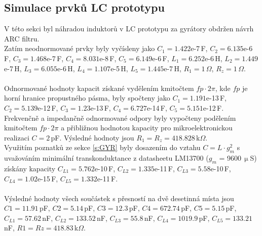 \subsection{Simulace prvků LC prototypu}\label{s:ARC}
V této sekci byl náhradou induktorů v LC prototypu za gyrátory obdržen návrh ARC filtru.\\
Zatím neodnormované prvky byly vyčísleny jako $C_1 = 1.422$e-7\,F, $C_2 = 6.135$e-6\,F, $C_3 = 1.468$e-7\,F, $C_4 = 8.031$e-8\,F, $C_5 = 6.149$e-6\,F, $L_1 = 6.252$e-6\,H, $L_2 = 1.449$e-7\,H, $L_3 = 6.055$e-6\,H, $L_4 = 1.107$e-5\,H, $L_5 = 1.445$e-7\,H, $R_1 = 1$\,$\Omega$, $R_z = 1$\,$\Omega$.\\
\\
\noindent Odnormované hodnoty kapacit získané vydělením kmitočtem $fp \cdot 2 \pi$, kde $fp$ je horní hranice propustného pásma, byly spočteny jako $C_1 = 1.191$e-13\,F, $C_2 = 5.139$e-12\,F, $C_3 = 1.23$e-13\,F, $C_4 = 6.727$e-14\,F, $C_5 = 5.151$e-12\,F.\\
\noindent Frekvenčně a impedančně odnormované odpory byly vypočteny podělením kmitočtem $fp \cdot 2 \pi$ a přibližnou hodnotou kapacity pro mikroelektronickou realizaci $C = 2$\,pF. Výsledné hodnoty jsou $R_1 = R_z = 418.828$\,k$\Omega$.\\
\noindent Využitím poznatků ze sekce \ref{s:GYR} byly dosazením do vztahu $C = L \cdot g_m^2$ s uvažováním minimální transkonduktance z datasheetu LM13700 ($g_m$ = 9600\,$\upmu$S) získány kapacity $C_{L1} = 5.762$e-10\,F, $C_{L2} = 1.335$e-11\,F, $C_{L3} = 5.58$e-10\,F, $C_{L4} = 1.02$e-15\,F, $C_{L5} = 1.332$e-11\,F.\\
\\
\noindent Výsledné hodnoty všech součástek s přesností na dvě desetinná místa jsou\\ $C1 = 11.91$\,pF, $C2 = 5.14$\,pF, $C3 = 12.3$\,pF, $C4 = 672.74$\,pF, $C5 = 5.15$\,pF, $C_{L1} = 57.62$\,nF, $C_{L2} = 133.52$\,nF, $C_{L3} = 55.8$\,nF, $C_{L4} = 1019.9$\,pF, $C_{L5} = 133.21$\,nF, $R1 = Rz = 418.83$\,k$\Omega$.
